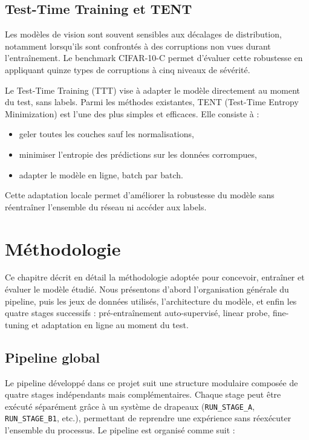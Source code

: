 \documentclass[12pt,a4paper]{report}
\begin{document}
	\section{Test-Time Training et TENT}
	
	Les modèles de vision sont souvent sensibles aux décalages de distribution, notamment lorsqu’ils sont confrontés à des corruptions non vues durant l’entraînement. Le benchmark CIFAR-10-C \cite{hendrycks2019benchmark} permet d’évaluer cette robustesse en appliquant quinze types de corruptions à cinq niveaux de sévérité.
	
	Le Test-Time Training (TTT) vise à adapter le modèle directement au moment du test, sans labels. Parmi les méthodes existantes, TENT (Test-Time Entropy Minimization) \cite{wang2021tent} est l’une des plus simples et efficaces. Elle consiste à :
	\begin{itemize}
		\item geler toutes les couches sauf les normalisations,
		\item minimiser l’entropie des prédictions sur les données corrompues,
		\item adapter le modèle en ligne, batch par batch.
	\end{itemize}
	
	Cette adaptation locale permet d’améliorer la robustesse du modèle sans réentraîner l’ensemble du réseau ni accéder aux labels.

	\chapter{Méthodologie}
	
	Ce chapitre décrit en détail la méthodologie adoptée pour concevoir, entraîner et évaluer le modèle étudié. Nous présentons d’abord l’organisation générale du pipeline, puis les jeux de données utilisés, l’architecture du modèle, et enfin les quatre stages successifs : pré-entraînement auto-supervisé, linear probe, fine-tuning et adaptation en ligne au moment du test.
	
	\section{Pipeline global}
	
	Le pipeline développé dans ce projet suit une structure modulaire composée de quatre stages indépendants mais complémentaires. Chaque stage peut être exécuté séparément grâce à un système de drapeaux (\texttt{RUN\_STAGE\_A}, \texttt{RUN\_STAGE\_B1}, etc.), permettant de reprendre une expérience sans réexécuter l’ensemble du processus. Le pipeline est organisé comme suit :
	
\end{document}
